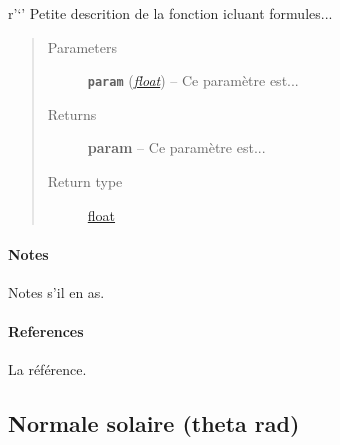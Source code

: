 \documentclass[letterpaper,10pt,english]{sphinxmanual}
\begin{document}
\begin{fulllineitems}
\label{python:solar_mod.angle_sunset}
r'`' Petite descrition de la fonction icluant formules...
\begin{quote}\begin{description}
\item[{Parameters}] \leavevmode
\textbf{\texttt{param}} (\href{https://docs.python.org/library/functions.html\#float}{\emph{float}}) -- Ce paramètre est...

\item[{Returns}] \leavevmode
\textbf{param} -- Ce paramètre est...

\item[{Return type}] \leavevmode
\href{https://docs.python.org/library/functions.html\#float}{float}

\end{description}\end{quote}
\paragraph{Notes}

Notes s'il en as.
\paragraph{References}

La référence.

\end{fulllineitems}



\subsection{Normale solaire (theta rad)}
\label{python:normale-solaire-theta-rad}
\end{document}
